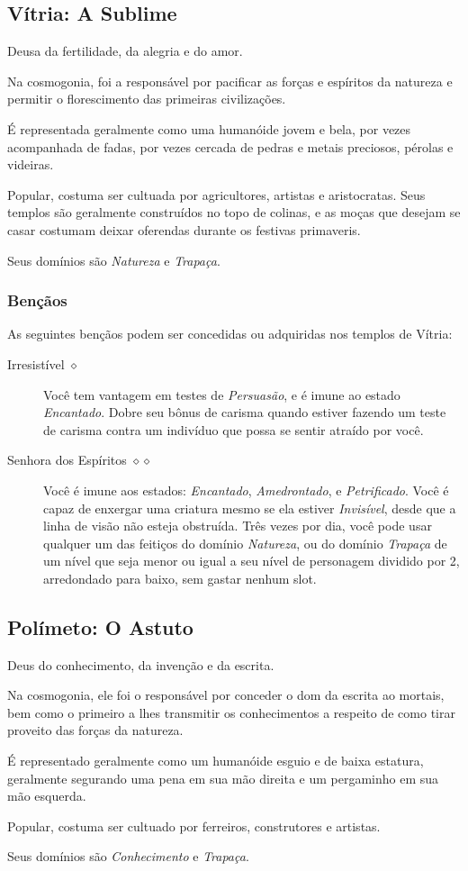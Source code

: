 \documentclass[letterpaper,twocolumn,openany]{dndbook}
\begin{document}
	\subsection{Vítria: A Sublime}
	Deusa da fertilidade, da alegria e do amor.
	\par Na cosmogonia, foi a responsável por pacificar as forças e espíritos da natureza e permitir o florescimento das primeiras civilizações.
	\par É representada geralmente como uma humanóide jovem e bela, por vezes acompanhada de fadas, por vezes cercada de pedras e metais preciosos, pérolas e videiras.
	\par Popular, costuma ser cultuada por agricultores, artistas e aristocratas. Seus templos são geralmente construídos no topo de colinas, e as moças que desejam se casar costumam deixar oferendas durante os festivas primaveris.
	\par Seus domínios são \textit{Natureza} e \textit{Trapaça}.
	\subsubsection{Bençãos}
	As seguintes bençãos podem ser concedidas ou adquiridas nos templos de Vítria:
	\begin{description}
		\item[Irresistível $\diamond$]
		Você tem vantagem em testes de \textit{Persuasão}, e é imune ao estado \textit{Encantado}. Dobre seu bônus de carisma quando estiver fazendo um teste de carisma contra um indivíduo que possa se sentir atraído por você.
		\item[Senhora dos Espíritos $\diamond\diamond$]
		Você é imune aos estados: \textit{Encantado}, \textit{Amedrontado}, e \textit{Petrificado}. Você é capaz de enxergar uma criatura mesmo se ela estiver \textit{Invisível}, desde que a linha de visão não esteja obstruída. Três vezes por dia, você pode usar qualquer um das feitiços do domínio \textit{Natureza}, ou do domínio \textit{Trapaça} de um nível que seja menor ou igual a seu nível de personagem dividido por 2, arredondado para baixo, sem gastar nenhum slot.
	\end{description}
	
	\subsection{Polímeto: O Astuto}
	Deus do conhecimento, da invenção e da escrita.
	\par Na cosmogonia, ele foi o responsável por conceder o dom da escrita ao mortais, bem como o primeiro a lhes transmitir os conhecimentos a respeito de como tirar proveito das forças da natureza.
	\par É representado geralmente como um humanóide esguio e de baixa estatura, geralmente segurando uma pena em sua mão direita e um pergaminho em sua mão esquerda.
	\par Popular, costuma ser cultuado por ferreiros, construtores e artistas.
	\par Seus domínios são \textit{Conhecimento} e \textit{Trapaça}.
\end{document}
